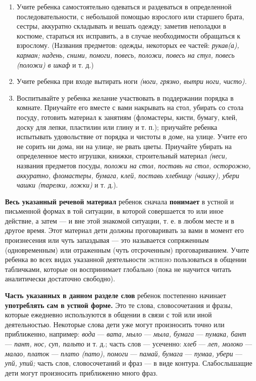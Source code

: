\documentclass{book}
\renewcommand{\emph}[1]{\textit{#1}}
\begin{document}
\begin{enumerate}
\def\labelenumi{\arabic{enumi}.}
\setcounter{enumi}{5}
\item
  
  Учите ребенка самостоятельно одеваться и раздеваться в определенной
  последовательности, с небольшой помощью взрослого или старшего брата,
  сестры, аккуратно складывать и вешать одежду; заметив неполадки в
  костюме, стараться их исправить, а в случае необходимости обращаться к
  взрослому. (Названия предметов: одежды, некоторых ее частей:
  \emph{рукав(а), карман; надень, сними, помоги, повесь, положи, повесь
  на стул, повесь (положи) в шкаф} и т. д.)
  
\item
  
  Учите ребенка при входе вытирать ноги \emph{(ноги, грязно, вытри ноги,
  чисто).}
  
\item
  
  Воспитывайте у ребенка желание участвовать в поддержании порядка в
  комнате. Приучайте его вместе с вами накрывать на стол, убирать со
  стола посуду, готовить материал к занятиям (фломастеры, кисти, бумагу,
  клей, доску для лепки, пластилин или глину и т. п.); приучайте ребенка
  испытывать удовольствие от порядка и чистоты в доме, на улице. Учите
  его не сорить ни дома, ни на улице, не рвать цветы. Приучайте убирать
  на определенное место игрушки, книжки, строительный материал
  \emph{(неси,} названия предметов посуды, \emph{положи на стол, поставь
  на стол, осторожно, аккуратно, фломастеры, бумага, клей, поставь
  хлебницу (чашку), убери чашки (тарелки, ложки)} и т. д.).
  
\end{enumerate}


\textbf{Весь указанный речевой материал} ребенок сначала
\textbf{понимает} в устной и письменной формах в той ситуации, в которой
совершается то или иное действие, а затем --- и вне этой знакомой
ситуации, т. е. в любом месте и в другое время. Этот материал дети
должны проговаривать за вами в момент его произнесения или чуть
запаздывая --- это называется сопряженным (одновременным) или отраженным
(чуть отсроченным) проговариванием. Учите ребенка во всех видах
указанной деятельности \textsc{эктиено} пользоваться в общении
табличками, которые он воспринимает глобально (пока не научится читать
аналитически достаточно свободно).

\textbf{Часть указанных в данном разделе слов} ребенок постепенно
начинает \textbf{употреблять сам в устной форме.} Это те слова,
словосочетания и фразы, которые ежедневно используются в общении в связи
с той или иной деятельностью. Некоторые слова дети уже могут произносить
точно или приближенно, например: \emph{вода} --- \emph{вата, мыло} ---
\emph{мыла, бумага} --- \emph{пумака, бант} --- \emph{пант, нос, суп,
пальто} и т. д.; часть слов --- усеченно: \emph{хлеб} --- \emph{леп,
молоко} --- \emph{малао, платок} --- \emph{плато (пато), помоги} ---
\emph{памай, бумага} --- \emph{пумаа, убери} --- \emph{упй, упий;} часть
слов, словосочетаний и фраз --- в виде контура. Слабослышащие дети могут
произносить приближенно много фраз.
\end{document}
